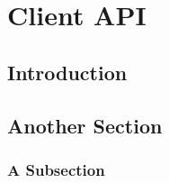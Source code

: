 \chapter{Client API}
\label{client_api}

\section{Introduction}
\label{introduction}

\section{Another Section}

\subsection{A Subsection}
